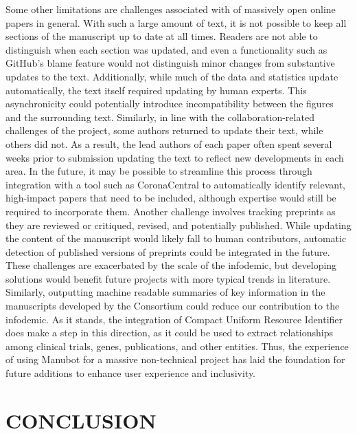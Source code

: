 \documentclass[twocolumn]{ceurart}
\begin{document}
Some other limitations are challenges associated with of massively open online papers in general.
With such a large amount of text, it is not possible to keep all sections of the manuscript up to date at all times.
Readers are not able to distinguish when each section was updated, and even a functionality such as GitHub's blame feature would not distinguish minor changes from substantive updates to the text.
Additionally, while much of the data and statistics update automatically, the text itself required updating by human experts.
This asynchronicity could potentially introduce incompatibility between the figures and the surrounding text.
Similarly, in line with the collaboration-related challenges of the project, some authors returned to update their text, while others did not.
As a result, the lead authors of each paper often spent several weeks prior to submission updating the text to reflect new developments in each area.
In the future, it may be possible to streamline this process through integration with a tool such as CoronaCentral \citep{Ybg667S0} to automatically identify relevant, high-impact papers that need to be included, although expertise would still be required to incorporate them.
Another challenge involves tracking preprints as they are reviewed or critiqued, revised, and potentially published.
While updating the content of the manuscript would likely fall to human contributors, automatic detection of published versions of preprints \citep{pESBLU4c} could be integrated in the future.
These challenges are exacerbated by the scale of the infodemic, but developing solutions would benefit future projects with more typical trends in literature.
Similarly, outputting machine readable summaries of key information in the manuscripts developed by the Consortium could reduce our contribution to the infodemic.
As it stands, the integration of Compact Uniform Resource Identifier does make a step in this direction, as it could be used to extract relationships among clinical trials, genes, publications, and other entities.
Thus, the experience of using Manubot for a massive non-technical project has laid the foundation for future additions to enhance user experience and inclusivity.

\hypertarget{conclusion}{%
\section{CONCLUSION}\label{conclusion}}
\end{document}
